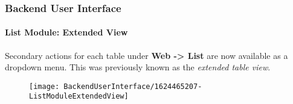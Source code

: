 %

\begin{frame}[fragile]
	\frametitle{Backend User Interface}
	\framesubtitle{List Module: Extended View}

	Secondary actions for each table under \textbf{Web -> List} are now available
	as a dropdown menu. This was previously known as the \textit{extended table view}.

	\begin{figure}
		\texttt{[image: BackendUserInterface/1624465207-ListModuleExtendedView]}
	\end{figure}

\end{frame}

